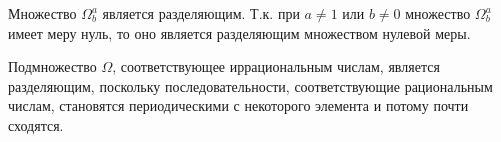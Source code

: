 \begin{corollary}
	Множество $\Omega^a_b$ является разделяющим.
	Т.к. при $a\neq 1$ или $b\neq 0$ множество $\Omega^a_b$ имеет меру нуль,
	то оно является разделяющим множеством нулевой меры.
\end{corollary}


\begin{remark}
	Подмножество $\Omega$, соответствующее иррациональным числам, является разделяющим,
	поскольку последовательности, соответствующие рациональным числам,
	становятся периодическими с некоторого элемента и потому почти сходятся.
\end{remark}
